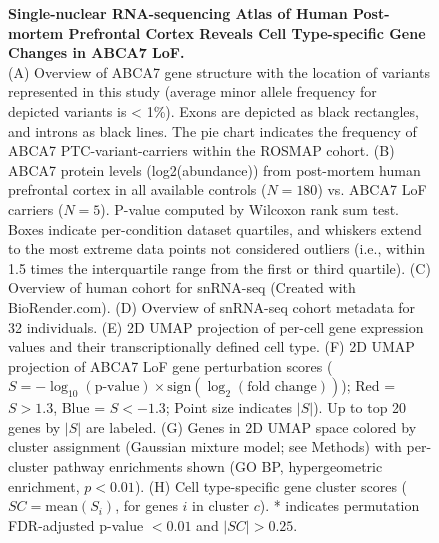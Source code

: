 \begin{figure}[ht]
    \centering
    \caption{
        \textbf{Single-nuclear RNA-sequencing Atlas of Human Post-mortem Prefrontal Cortex Reveals Cell Type-specific Gene Changes in ABCA7 LoF.}\\[1ex]
        (A) Overview of ABCA7 gene structure with the location of variants represented in this study (average minor allele frequency for depicted variants is < 1\%). Exons are depicted as black rectangles, and introns as black lines. The pie chart indicates the frequency of ABCA7 PTC-variant-carriers within the ROSMAP cohort. 
        (B) ABCA7 protein levels (log2(abundance)) from post-mortem human prefrontal cortex in all available controls ($N=180$) vs. ABCA7 LoF carriers ($N=5$). P-value computed by Wilcoxon rank sum test. Boxes indicate per-condition dataset quartiles, and whiskers extend to the most extreme data points not considered outliers (i.e., within 1.5 times the interquartile range from the first or third quartile). 
        (C) Overview of human cohort for snRNA-seq (Created with BioRender.com). 
        (D) Overview of snRNA-seq cohort metadata for 32 individuals. 
        (E) 2D UMAP projection of per-cell gene expression values and their transcriptionally defined cell type. 
        (F) 2D UMAP projection of ABCA7 LoF gene perturbation scores ($S = -\log_{10}(\text{p-value}) \times \text{sign}(\log_2(\text{fold change}))$); Red = $S>1.3$, Blue = $S<-1.3$; Point size indicates $|S|$). Up to top 20 genes by $|S|$ are labeled. 
        (G) Genes in 2D UMAP space colored by cluster assignment (Gaussian mixture model; see Methods) with per-cluster pathway enrichments shown (GO BP, hypergeometric enrichment, $p<0.01$). 
        (H) Cell type-specific gene cluster scores ($SC = \text{mean}(S_i)$, for genes $i$ in cluster $c$). * indicates permutation FDR-adjusted p-value $< 0.01$ and $|SC| > 0.25$.
    }
    \label{fig:main_atlas}
\end{figure}

